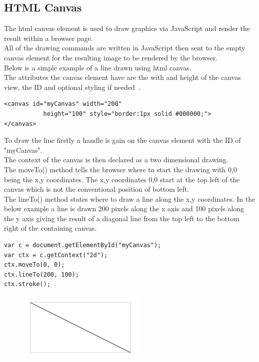 \subsection{HTML Canvas}
The html canvas element is used to draw graphics via JavaScript and render the result within a browser page.\\
All of the drawing commands are written in JavaScript then sent to the empty canvas element for the resulting image to be rendered by the browser.\\
Below is a simple example of a line drawn using html canvas.~\cite{CanvasDoc:online}\\
The attributes the canvas element have are the with and height of the canvas view, the ID and optional styling if needed~\cite{CanvasExample:online}.

\begin{verbatim}
<canvas id="myCanvas" width="200" 
           height="100" style="border:1px solid #000000;">
</canvas>
\end{verbatim}
To draw the line firstly a handle is gain on the canvas element with the ID of "myCanvas".\\
The context of the canvas is then declared as a two dimensional drawing.\\
The moveTo() method tells the browser where to start the drawing with 0,0 being the x,y coordinates.
The x,y coordinates 0,0 start at the top left of the canvas which is not the conventional position of bottom left.\\
The lineTo() method states where to draw a line along the x,y coordinates. In the below example a line is drawn 200 pixels along the x axis and 100 pixels along the y axis giving the result of a diagonal line from the top left to the bottom right of the containing canvas.~\cite{CanvasExample:online,CanvasDoc:online}
\begin{verbatim}
var c = document.getElementById("myCanvas");
var ctx = c.getContext("2d");
ctx.moveTo(0, 0);
ctx.lineTo(200, 100);
ctx.stroke();
\end{verbatim}
\begin{figure}[H]
	\centering
	\includegraphics[width=0.7\linewidth]{img/canvasLine}
	\caption{}
	\label{fig:canvasline}
\end{figure}

